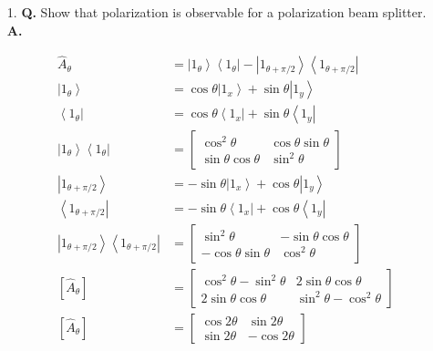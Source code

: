 \documentclass[main.tex]{subfiles}
\begin{document}
\begin{enumerate}
    \item [1.] \textbf{Q.} Show that polarization is observable for a polarization beam splitter. \textbf{A.} 
  
    \begin{align*}
    \hat{A}_\theta & = \left| 1_\theta \right\rangle \left\langle 1_\theta\right|
    - \left|1_{\theta+\pi / 2}\right\rangle \left\langle 1_{\theta+\pi / 2} \right| \\
    \left|1_\theta\right\rangle &= \cos \theta\left|1_x\right\rangle+\sin \theta\left|1_y\right\rangle \\
    \left\langle1_\theta\right| &= \cos \theta\left\langle1_x\right|+\sin \theta\left\langle1_y\right| \\
    \left| 1_\theta \right\rangle \left\langle 1_\theta\right| & = \left[\begin{array}{cc}
    \cos^2 \theta & \cos\theta \sin\theta \\
    \sin\theta \cos \theta & \sin^2 \theta
    \end{array}\right]\\
    \left|1_{\theta+\pi / 2}\right\rangle & = -\sin \theta\left|1_x\right\rangle+\cos\theta \left|1_y\right\rangle \\
    \left\langle1_{\theta+\pi / 2}\right| & = -\sin \theta \left\langle1_x\right|+\cos\theta \left\langle1_y\right| \\
    \left|1_{\theta+\pi / 2}\right\rangle \left\langle 1_{\theta+\pi / 2} \right| &= \left[\begin{array}{cc}
    \sin^2 \theta & -\sin\theta\cos\theta\\
    -\cos\theta\sin\theta & \cos^2 \theta
    \end{array}\right]\\
    \left[\hat{A}_\theta\right] &= \left[\begin{array}{cc}
    \cos^2 \theta - \sin^2 \theta & 2\sin\theta\cos\theta \\
    2\sin\theta\cos\theta & \sin^2 \theta - \cos^2 \theta
    \end{array}\right]\\
    \left[\hat{A}_\theta\right] &= \left[\begin{array}{cc}
    \cos 2 \theta & \sin 2 \theta \\
    \sin 2 \theta & -\cos 2 \theta
    \end{array}\right]
    \end{align*}

\end{enumerate}
\end{document}
